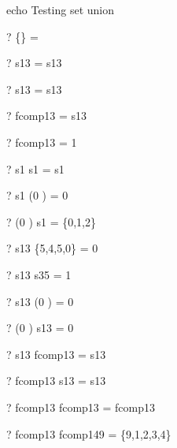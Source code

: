 echo     Testing set union
\begin{zed} \vdash?  \{\}      \cup \emptyset   = \emptyset \end{zed}
\begin{zed} \vdash?  \emptyset \cup s13         = s13 \end{zed}
\begin{zed} \vdash?  s13       \cup \emptyset   = s13 \end{zed}
\begin{zed} \vdash?  \emptyset \cup fcomp13     = s13 \end{zed}
\begin{zed} \vdash?  fcomp13   \cup \emptyset   = 1  \end{zed}
\begin{zed} \vdash?  s1        \cup s1          = s1 \end{zed}
\begin{zed} \vdash?  s1        \cup (0 ) = 0  \end{zed}
\begin{zed} \vdash?  (0 ) \cup s1        = \{0,1,2\} \end{zed}
\begin{zed} \vdash?  s13       \cup \{5,4,5,0\} = 0  \end{zed}
\begin{zed} \vdash?  s13       \cup s35         = 1  \end{zed}
\begin{zed} \vdash?  s13       \cup (0 ) = 0  \end{zed}
\begin{zed} \vdash?  (0 ) \cup s13       = 0  \end{zed}
\begin{zed} \vdash?  s13       \cup fcomp13     = s13 \end{zed}
\begin{zed} \vdash?  fcomp13   \cup s13         = s13 \end{zed}
\begin{zed} \vdash?  fcomp13   \cup fcomp13     = fcomp13 \end{zed}
\begin{zed} \vdash?  fcomp13   \cup fcomp149    = \{9,1,2,3,4\} \end{zed}



